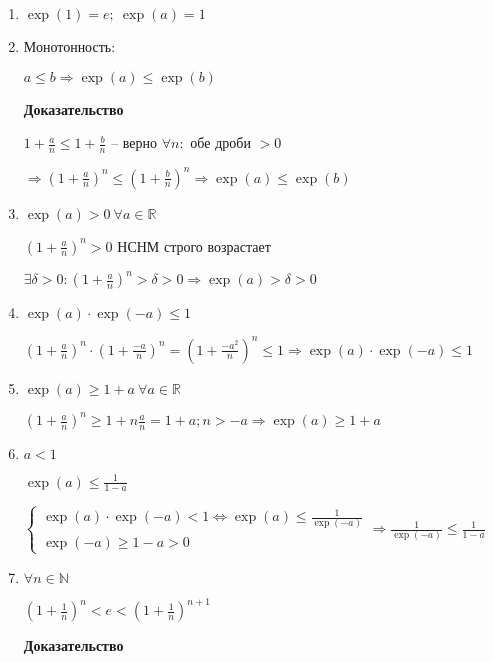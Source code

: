 \documentclass[14pt, letter paper]{article}
\begin{document}
\begin{enumerate}
    \item $\exp(1) = e;\ \exp(a) = 1$
    \item Монотонность:

    $a \leq b \Rightarrow \exp(a) \leq \exp(b)$

    \begin{center}
        \textbf{Доказательство}
    \end{center}

    $1 + \frac{a}{n} \leq 1 + \frac{b}{n}$ -- верно $\forall n:$ обе дроби $> 0$

    $\Rightarrow (1 + \frac{a}{n})^n \leq (1 + \frac{b}{n})^n \Rightarrow \exp(a) \leq \exp(b)$

    \item $\exp(a) > 0\ \forall a \in \mathds{R}$

    $(1 + \frac{a}{n})^n > 0$ НСНМ строго возрастает

    $\exists \delta > 0: (1 + \frac{a}{n})^n > \delta > 0 \Rightarrow \exp(a) > \delta > 0$

    \item $\exp(a) \cdot \exp(-a) \leq 1$

    $(1 + \frac{a}{n})^n \cdot (1 + \frac{-a}{n})^n = (1 + \frac{-a^2}{n})^n \leq 1 \Rightarrow \exp(a) \cdot \exp(-a) \leq 1$

    \item $\exp(a) \geq 1 + a\ \forall a \in \mathds{R}$

    $(1 + \frac{a}{n})^n \geq 1 + n \frac{a}{n} = 1 + a; n > -a \Rightarrow \exp(a) \geq 1 + a$

    \item $a < 1$

    $\exp(a) \leq \frac{1}{1 - a}$

    $\begin{cases}
        \exp(a) \cdot \exp(-a) < 1 \Leftrightarrow \exp(a) \leq \frac{1}{\exp(-a)} \\
        \exp(-a) \geq 1 - a > 0
    \end{cases} \Rightarrow \frac{1}{\exp(-a)} \leq \frac{1}{1-a}$

    \item $\forall n \in \mathds{N}$

    $(1 + \frac{1}{n})^n < e < (1 + \frac{1}{n})^{n+1}$

    \begin{center}
        \textbf{Доказательство}
    \end{center}


\end{enumerate}
\end{document}

